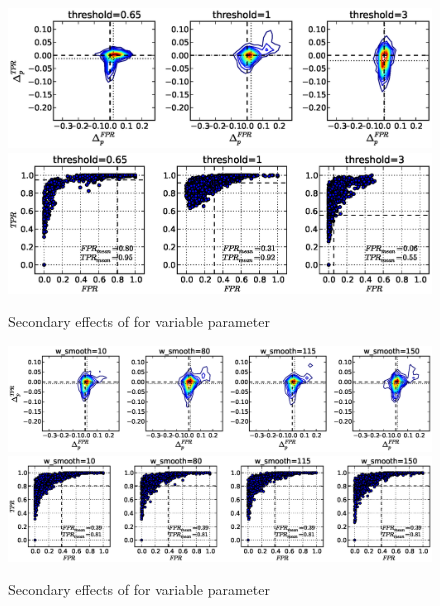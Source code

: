 \begin{figure}[!h]
\begin{center}
\includegraphics[width=6in]{../fig/final/delta_hist_sec/detection_window_hrs/threshold}
\includegraphics[width=5.5in]{../fig/final/position/all_allowed/detection_window_hrs/threshold}
\end{center}
\caption{\label{fig:delta_sec6} Secondary effects of  for
  variable parameter }
\end{figure}

\begin{figure}[!h]
\begin{center}
\includegraphics[width=6in]{../fig/final/delta_hist_sec/detection_window_hrs/w_smooth}
\includegraphics[width=5.5in]{../fig/final/position/all_allowed/detection_window_hrs/w_smooth}
\end{center}
\caption{\label{fig:delta_sec6} Secondary effects of  for
  variable parameter }
\end{figure}

